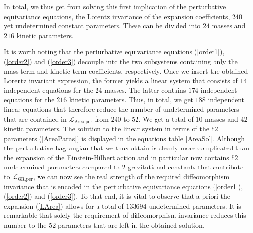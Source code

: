 In total, we thus get from solving this first implication of the perturbative equivariance equations, the Lorentz invariance of the expansion coefficients, $240$ yet undetermined constant parameters. These can be divided into $24$ masses and $216$ kinetic parameters.

It is worth noting that the perturbative equivariance equations (\ref{order1}), (\ref{order2}) and (\ref{order3}) decouple into the two subsystems containing only the mass term and kinetic term coefficients, respectively. Once we insert the obtained Lorentz invariant expression, the former yields a linear system that consists of $14$ independent equations for the $24$ masses. The latter contains $174$ independent equations for the $216$ kinetic parameters. Thus, in total, we get $188$ independent linear equations that therefore reduce the number of undetermined parameters that are contained in $\mathcal{L}_{\text{Area,per}}$ from $240$ to $52$. We get a total of $10$ masses and $42$ kinetic parameters. The solution to the linear system in terms of the $52$ parameters (\ref{AreaParas}) is displayed in the equations table \ref{AreaSol}. Although the perturbative Lagrangian that we thus obtain is clearly more complicated than the expansion of the Einstein-Hilbert action and in particular now contains $52$ undetermined parameters compared to $2$ gravitational constants that contribute to $\mathcal{L}_{\text{GR,per}}$, we can now see the real strength of the required diffeomorphism invariance that is encoded in the perturbative equivariance equations (\ref{order1}), (\ref{order2}) and (\ref{order3}). To that end, it is vital to observe that a priori the expansion (\ref{LArea}) allows for a total of $133694$ undetermined parameters. It is remarkable that solely the requirement of diffeomorphism invariance reduces this number to the $52$ parameters that are left in the obtained solution. 


